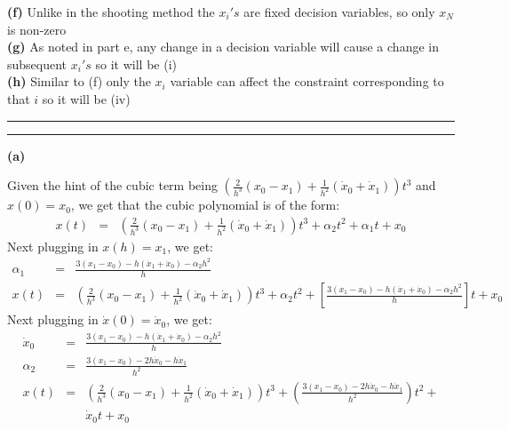 \documentclass[11pt]{article}
\newcommand{\question}[2] {\vspace{.25in} \hrule\vspace{0.5em}
\noindent{\bf #1: #2} \vspace{0.5em}
\hrule \vspace{.10in}}
\renewcommand{\part}[1] {\vspace{.10in} {\bf (#1)}}
\begin{document}
\part{f} Unlike in the shooting method the $x_{i}'s$ are fixed decision variables, so only $x_N$ is non-zero\\

\part{g} As noted in part e, any change in a decision variable will cause a change in subsequent $x_i's$ so it will be (i)\\

\part{h} Similar to (f) only the $x_i$ variable can affect the constraint corresponding to that $i$ so it will be (iv)

\question{2}{Direct Collocation}

\part{a} 

Given the hint of the cubic term being $(\frac{2}{h^3}(x_0-x_1)+\frac{1}{h^2}(\dot{x}_0 + \dot{x}_1))t^3$ and $x(0) = x_0$, we get that the cubic polynomial is of the form:
\begin{eqnarray*}
	x(t) &=& (\frac{2}{h^3}(x_0-x_1)+\frac{1}{h^2}(\dot{x}_0 + \dot{x}_1))t^3 + \alpha_2t^2 + \alpha_1t + x_0
\end{eqnarray*}
Next plugging in $x(h) = x_1$, we get:
\begin{eqnarray*}
	\alpha_1 &=& \frac{3(x_1-x_0) - h(\dot{x}_1 + \dot{x}_0) - \alpha_2h^2}{h}\\
	x(t) &=& (\frac{2}{h^3}(x_0-x_1)+\frac{1}{h^2}(\dot{x}_0 + \dot{x}_1))t^3 + \alpha_2t^2 + [\frac{3(x_1-x_0) - h(\dot{x}_1 + \dot{x}_0) - \alpha_2h^2}{h}]t + x_0
\end{eqnarray*}
Next plugging in $\dot{x}(0) = \dot{x}_0$, we get:
\begin{eqnarray*}
	\dot{x}_0 &=& \frac{3(x_1-x_0) - h(\dot{x}_1 + \dot{x}_0) - \alpha_2h^2}{h}\\
	\alpha_2 &=& \frac{3(x_1-x_0) -2h\dot{x}_0 -h\dot{x}_1}{h^2}\\
	x(t) &=& (\frac{2}{h^3}(x_0-x_1)+\frac{1}{h^2}(\dot{x}_0 + \dot{x}_1))t^3 + (\frac{3(x_1-x_0) -2h\dot{x}_0 -h\dot{x}_1}{h^2})t^2 +\\
	     && \dot{x}_0t + x_0
\end{eqnarray*}
\end{document}
